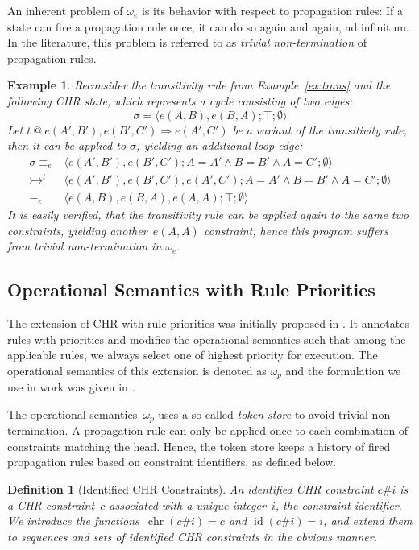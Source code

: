 \documentclass{tlp}
\newtheorem{example}{Example}[section]
\newtheorem{definition}{Definition}[section]
\DeclareMathOperator{\chr}{chr}
\DeclareMathOperator{\id}{id}
\def\tuple#1{\langle #1 \rangle}
\newcommand{\stesq}[3]{\ensuremath{\tuple{#1; #2; #3}}}
\newcommand{\oesq}{\ensuremath{{\omega_e}}}
\newcommand{\eesq}{\ensuremath{\equiv_e}}
\newcommand{\der}{\ensuremath{\rightarrowtail}}
\begin{document}
An inherent problem of $\oesq$ is its behavior with respect to propagation rules:
If a state can fire a propagation rule once, it can do so again and again, ad
infinitum. In the literature, this problem is referred to as \emph{trivial
non-termination} of propagation rules.

\begin{example}\label{ex:trans_omega_e}Reconsider the transitivity rule from
Example~\ref{ex:trans} and the following CHR state, which represents a cycle
consisting of two edges: \[ \sigma = \stesq{e(A,B),e(B,A)}{\top}{\emptyset}
\]
Let $t\ @\ e(A',B'), e(B',C') \Longrightarrow e(A',C')$ be a variant of the
transitivity rule, then it can be applied to $\sigma$, yielding an additional
loop edge:
\[
\begin{array}{ll}
\sigma \eesq & \stesq{e(A',B'), e(B',C')}{A=A' \land B=B' \land
A=C'}{\emptyset}\\
\der^t & \stesq{e(A',B'), e(B',C'), e(A',C')}{A=A' \land B=B'
\land A=C'}{\emptyset}\\
\eesq & \stesq{e(A,B), e(B,A), e(A,A)}{\top}{\emptyset}
\end{array}
\]
It is easily verified, that the transitivity rule can be applied again to
the same two constraints, yielding another~$e(A,A)$ constraint, hence this
program suffers from trivial non-termination in $\omega_e$.
\end{example}

\subsection{Operational Semantics with Rule Priorities}

The extension of CHR with rule priorities was initially proposed in
\cite{dekoninckschrijversdemoen07}. It annotates rules with priorities and
modifies the operational semantics such that among the applicable rules, we
always select one of highest priority for execution. The operational semantics of
this extension is denoted as $\omega_p$ and the formulation we use in work was
given in \cite{DeKoninck2008}.

The operational semantics~$\omega_p$ uses a so-called \emph{token store} to
avoid trivial non-termination. A propagation rule can only be applied once to each
combination of constraints matching the head. Hence, the token store keeps a
history of fired propagation rules based on constraint identifiers, as defined
below.

\begin{definition}[Identified CHR Constraints] An {\em identified CHR constraint}
$c\#i$ is a CHR constraint~$c$ associated with a unique integer~$i$, the {\em
constraint identifier}. We introduce the functions~$\chr(c\#i) = c$ and
$\id(c\#i) = i$, and extend them to sequences and sets of identified CHR
constraints in the obvious manner.
\end{definition}
\end{document}
